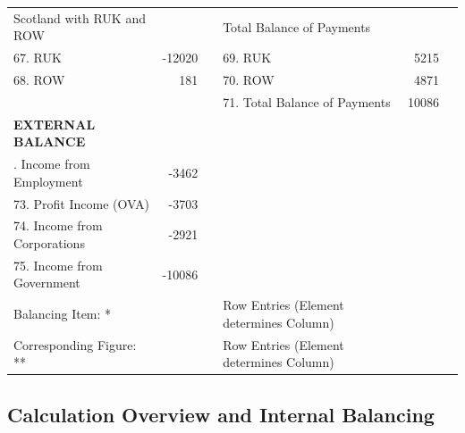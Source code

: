 \begin{table}[H]
\begin{scriptsize}
\begin{centering}
\begin{spacing}{1.2}
\begin{tabular}{lrllrl}
    \hline
\bigstrut[t] \quad \enspace \thinspace Scotland with RUK and ROW & &   & \quad \enspace \thinspace Total Balance of Payments & & \\
       67. RUK & -12020 & & 69. RUK & 5215 &  \\
       68. ROW & 181 & & 70. ROW & 4871 & \\
       & & & 71. Total Balance of Payments & 10086 & \\  
    \hline    
    \textbf{EXTERNAL BALANCE} \bigstrut\\
    \hline
\bigstrut[t]   72. Income from Employment & -3462 & & & & \\
       73. Profit Income (OVA) & -3703 & & & &  \\
       74. Income from Corporations & -2921 & & & & \\
       75. Income from Government & -10086 & & & & \\ 
    \hline
    \hline    
\qquad \qquad \qquad Balancing Item: *   & & & Row Entries (Element determines Column)  \\ 
\qquad \qquad \qquad Corresponding Figure: ** & & & Row Entries (Element determines Column)  \bigstrut\\       
          \hline            
    \bottomrule
\end{tabular}%
\bigskip \begin{flushright}\end{flushright} \label{tab:2.4.1}
\end{spacing} \end{centering}  \end{scriptsize} \end{table}


\subsection{Calculation Overview and Internal Balancing}
\label{sec:2.4.2}

